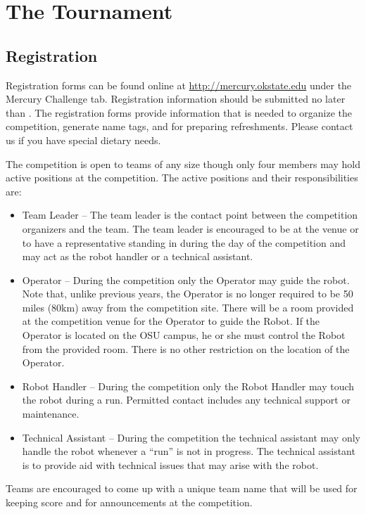 \section{The Tournament}
\subsection{Registration}
Registration forms can be found online at \url{http://mercury.okstate.edu} under the Mercury Challenge tab. Registration information should be submitted no later than \textbf{\registration}. The registration forms provide information that is needed to organize the competition, generate name tags, and for preparing refreshments. Please contact us if you have special dietary needs.

The competition is open to teams of any size though only four members may hold active positions at the competition. The active positions and their responsibilities are:

\begin{itemize}
\item Team Leader – The team leader is the contact point between the competition organizers and the team. The team leader is encouraged to be at the venue or to have a representative standing in during the day of the competition and may act as the robot handler or a technical assistant.
\item Operator – During the competition only the Operator may guide the robot. Note that, unlike previous years, the Operator is no longer required to be 50 miles (80km) away from the competition site. There will be a room provided at the competition venue for the Operator to guide the Robot. If the Operator is located on the OSU campus, he or she must control the Robot from the provided room. There is no other restriction on the location of the Operator.
\item Robot Handler – During the competition only the Robot Handler may touch the robot during a run. Permitted contact includes any technical support or maintenance.
\item Technical Assistant – During the competition the technical assistant may only handle the robot whenever a “run” is not in progress. The technical assistant is to provide aid with technical issues that may arise with the robot.
\end{itemize}

Teams are encouraged to come up with a unique team name that will be used for keeping score and for announcements at the competition. 

